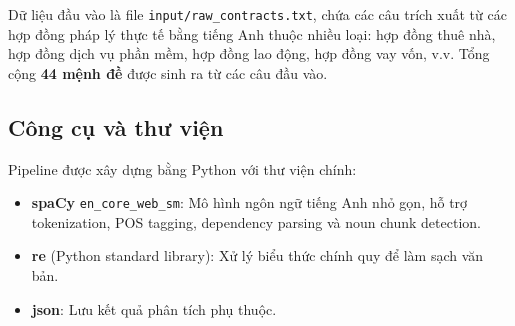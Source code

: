 Dữ liệu đầu vào là file \texttt{input/raw\_contracts.txt}, chứa các câu trích xuất từ các hợp đồng pháp lý thực tế bằng tiếng Anh thuộc nhiều loại: hợp đồng thuê nhà, hợp đồng dịch vụ phần mềm, hợp đồng lao động, hợp đồng vay vốn, v.v. Tổng cộng \textbf{44 mệnh đề} được sinh ra từ các câu đầu vào.

\subsection{Công cụ và thư viện}

Pipeline được xây dựng bằng Python với thư viện chính:
\begin{itemize}
    \item \textbf{spaCy} \texttt{en\_core\_web\_sm}: Mô hình ngôn ngữ tiếng Anh nhỏ gọn, hỗ trợ tokenization, POS tagging, dependency parsing và noun chunk detection.
    \item \textbf{re} (Python standard library): Xử lý biểu thức chính quy để làm sạch văn bản.
    \item \textbf{json}: Lưu kết quả phân tích phụ thuộc.
\end{itemize}
